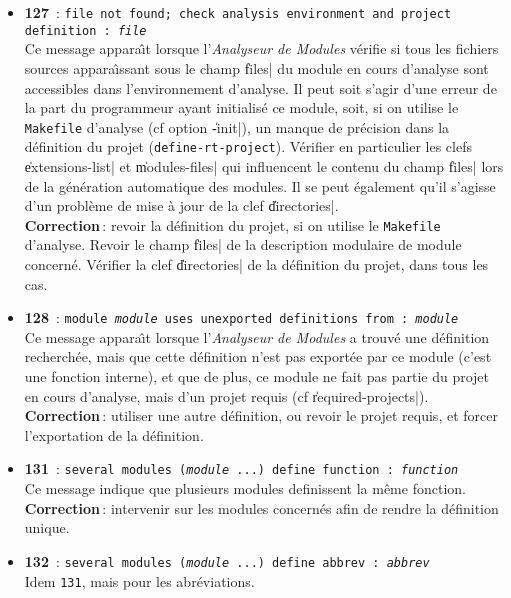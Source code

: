 \begin{itemize}
\item {\Large {\bf 127}}\ : {\tt file not found; check analysis environment
and project definition : {\em file}}\\
Ce message appara\^{\i}t lorsque l'{\em Analyseur de Modules} v\'{e}rifie si
tous les fichiers sources appara\^{\i}ssant sous le champ \|files| du
module en cours d'analyse sont accessibles dans l'environnement
d'analyse. Il peut soit s'agir d'une erreur de la part du programmeur
ayant initialis\'{e} ce module, soit, si on utilise le {\tt Makefile} d'analyse
(cf option \|-init|), un manque de pr\'{e}cision dans la d\'{e}finition du
projet ({\tt define-rt-project}). V\'{e}rifier en particulier les clefs
\|extensions-list| et \|modules-files| qui influencent le contenu du
champ \|files| lors de la g\'{e}n\'{e}ration automatique des modules. Il se
peut \'{e}galement qu'il 
s'agisse d'un probl\`{e}me de mise \`{a} jour de la clef \|directories|. \\
{\bf Correction}\,: revoir la d\'{e}finition du projet, si on utilise le
{\tt Makefile} d'analyse. Revoir le champ \|files| de la  description
modulaire de module concern\'{e}.
V\'{e}rifier la clef \|directories| de la d\'{e}finition
du projet, dans tous les cas.

\item {\Large {\bf 128}}\ : {\tt module {\em module} uses unexported definitions
from : {\em module}}\\
Ce message appara\^{\i}t lorsque l'{\em Analyseur de Modules} a trouv\'{e} une
d\'{e}finition recherch\'{e}e, mais que cette d\'{e}finition n'est pas
export\'{e}e par ce module (c'est une fonction interne), et que de plus,
ce module ne fait pas partie du projet en cours d'analyse, mais d'un
projet requis (cf \|required-projects|).\\
{\bf Correction}\,: utiliser une autre d\'{e}finition, ou revoir le projet
requis, et forcer l'exportation de la d\'{e}finition.

\item {\Large {\bf 131}}\ : {\tt several modules ({\em module} ...) define
function : {\em function}}\\
Ce message indique que plusieurs modules definissent la m\^{e}me
fonction.\\
{\bf Correction}\,: intervenir sur les modules concern\'{e}s afin de rendre
la d\'{e}finition unique.

\item {\Large {\bf 132}}\ : {\tt several modules ({\em module} ...) define
abbrev : {\em abbrev}}\\
Idem {\tt 131}, mais pour les abr\'{e}viations.


\end{itemize}
